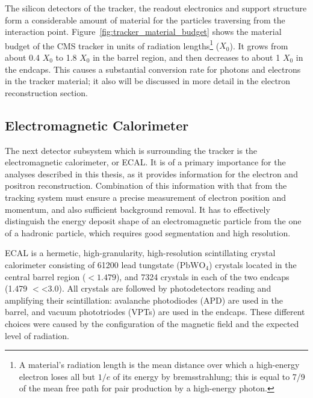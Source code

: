 The silicon detectors of the tracker, the readout electronics and support structure form a considerable amount of
material for the particles traversing from the interaction point. Figure~\ref{fig:tracker_material_budget}
\autocite{CMS} shows the material budget of the CMS tracker in units of radiation lengths\footnote{A material's
radiation length is the mean distance over which a high-energy electron loses all but $1/e$ of its energy by
bremsstrahlung; this is equal to \num{7/9} of the mean free path for pair production by a high-energy photon.} ($X_0$).
It grows from about \num{0.4} $X_0$ to \num{1.8} $X_0$ in the barrel region, and then decreases to about \num{1} $X_0$
in the endcaps. This causes a substantial conversion rate for photons and electrons in the tracker material; it also
will be discussed in more detail in the electron reconstruction section.


\subsection{Electromagnetic Calorimeter}
The next detector subsystem which is surrounding the tracker is the electromagnetic calorimeter, or ECAL. It is of a
primary importance for the analyses described in this thesis, as it provides information for the electron and positron
reconstruction. Combination of this information with that from the tracking system must ensure a precise measurement of
electron position and momentum, and also sufficient background removal. It has to effectively distinguish the energy
deposit shape of an electromagnetic particle from the one of a hadronic particle, which requires good segmentation and
high resolution.

ECAL is a hermetic, high-granularity, high-resolution scintillating crystal calorimeter consisting of \num{61200} lead
tungstate ($\textrm{PbWO}_4$) crystals located in the central barrel region (\abs\eta $<1.479$), and \num{7324} crystals
in each of the two endcaps (\num{1.479} $<$\abs\eta\num{<3.0}). All crystals are followed by photodetectors reading and
amplifying their scintillation: avalanche photodiodes (APD) are used in the barrel, and vacuum phototriodes (VPTs) are
used in the endcaps. These different choices were caused by the configuration of the magnetic field and the expected
level of radiation.

